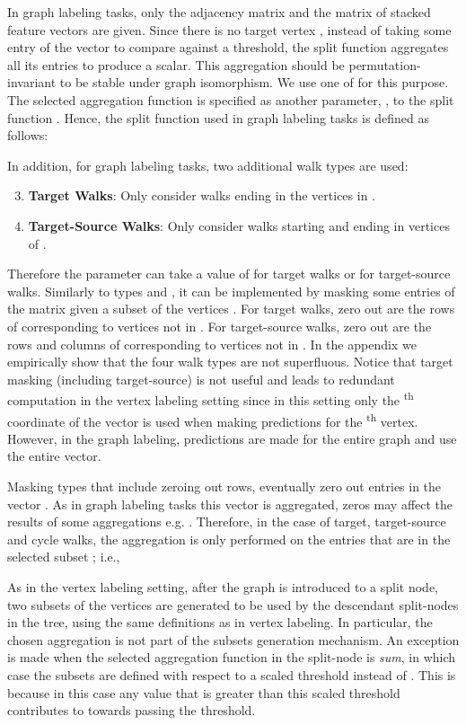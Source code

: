 In graph labeling tasks, only the adjacency matrix  and the matrix of stacked feature vectors  are given. Since there is no target vertex , instead of taking some entry of the vector  to compare against a threshold, the split function aggregates all its entries to produce a scalar. This aggregation should be permutation-invariant to be stable under graph isomorphism. We use one of  for this purpose. The selected aggregation function is specified as another parameter, , to the split function .
Hence, the split function used in graph labeling tasks is defined as follows:

In addition, for graph labeling tasks, two additional walk types are used:
\begin{enumerate}
\setcounter{enumi}{2}
\item \textbf{Target Walks}: Only consider walks ending in the vertices in .
\item \textbf{Target-Source Walks}:  Only consider walks starting and ending in  vertices of .
\end{enumerate}
Therefore the parameter  can take a value of  for target walks or  for target-source walks. Similarly to types  and , it can be implemented by masking some entries of the matrix  given a subset of the vertices .
For target walks, zero out are the rows of  corresponding to vertices not in . 
For target-source walks, zero out are the rows and columns of  corresponding to vertices not in . In the appendix we empirically show that the four walk types are not superfluous.
Notice that target masking (including target-source) is not useful and leads to redundant computation in the vertex labeling setting since in this setting only the \textsuperscript{th} coordinate of the vector  is used when making predictions for the \textsuperscript{th} vertex. However, in the graph labeling, predictions are made for the entire graph and use the entire vector.

Masking types that include zeroing out rows, eventually zero out entries in the vector . As in graph labeling tasks this vector is aggregated, zeros may affect the results of some aggregations e.g. . Therefore, in the case of target, target-source and cycle walks, the aggregation is only performed on the entries that are in the selected subset ; i.e., 


As in the vertex labeling setting, after the graph is introduced to a split node, two subsets of the vertices are generated to be used by the descendant split-nodes in the tree, using the same definitions as in vertex labeling.
In particular, the chosen aggregation is not part of the subsets generation mechanism. An exception is made when the selected aggregation function in the split-node is \emph{sum}, in which case the subsets are defined with respect to a scaled threshold  instead of . This is because in this case any value that is greater than this scaled threshold contributes to  towards passing the threshold.

 







